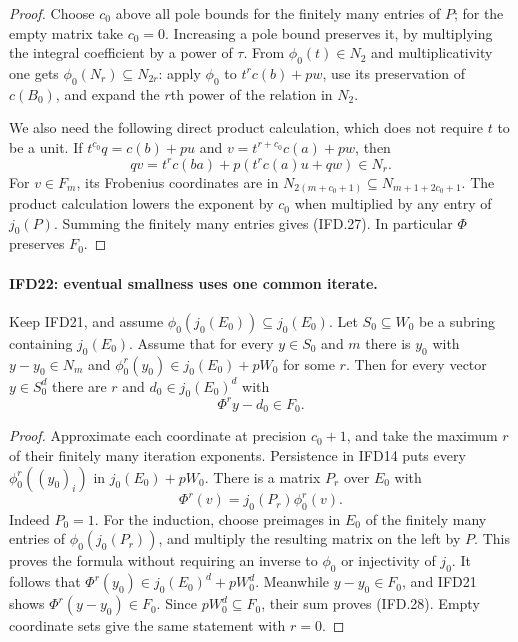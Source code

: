 \begin{proof}
Choose $c_0$ above all pole bounds for the finitely many entries
of $P$; for the empty matrix take $c_0=0$.
Increasing a pole bound preserves it, by multiplying the integral
coefficient by a power of $\tau$.
From $\phi_0(t)\in N_2$ and multiplicativity one gets
$\phi_0(N_r)\subseteq N_{2r}$: apply $\phi_0$ to
$t^rc(b)+pw$, use its preservation of $c(B_0)$, and expand the
$r$th power of the relation in $N_2$.

We also need the following direct product calculation, which does
not require $t$ to be a unit. If $t^{c_0}q=c(b)+pu$ and
$v=t^{r+c_0}c(a)+pw$, then
\[
                         qv=t^rc(ba)+p(t^rc(a)u+qw)\in N_r.
\]
For $v\in F_m$, its Frobenius coordinates are in
$N_{2(m+c_0+1)}\subseteq N_{m+1+2c_0+1}$.
The product calculation lowers the exponent by $c_0$ when
multiplied by any entry of $j_0(P)$. Summing the finitely many
entries gives (IFD.27). In particular $\Phi$ preserves $F_0$.
\end{proof}

\paragraph{IFD22: eventual smallness uses one common iterate.}
\label{claim:IFD22}
Keep IFD21, and assume $\phi_0(j_0(E_0))\subseteq j_0(E_0)$.
Let $S_0\subseteq W_0$ be a subring containing $j_0(E_0)$.
Assume that for every $y\in S_0$ and $m$ there is $y_0$ with
$y-y_0\in N_m$ and $\phi_0^r(y_0)\in j_0(E_0)+pW_0$ for
some $r$. Then for every vector $y\in S_0^d$ there are $r$
and $d_0\in j_0(E_0)^d$ with
\[
                              \Phi^r y-d_0\in F_0.         \tag{IFD.28}
\]

\begin{proof}
Approximate each coordinate at precision $c_0+1$, and take the
maximum $r$ of their finitely many iteration exponents.
Persistence in IFD14 puts every $\phi_0^r((y_0)_i)$ in
$j_0(E_0)+pW_0$. There is a matrix $P_r$ over $E_0$ with
\[
                              \Phi^r(v)=j_0(P_r)\phi_0^r(v).
\]
Indeed $P_0=1$. For the induction, choose preimages in $E_0$ of
the finitely many entries of $\phi_0(j_0(P_r))$, and multiply
the resulting matrix on the left by $P$. This proves the formula
without requiring an inverse to $\phi_0$ or injectivity of $j_0$.
It follows that $\Phi^r(y_0)\in j_0(E_0)^d+pW_0^d$.
Meanwhile $y-y_0\in F_0$, and IFD21 shows
$\Phi^r(y-y_0)\in F_0$. Since $pW_0^d\subseteq F_0$, their
sum proves (IFD.28). Empty coordinate sets give the same statement
with $r=0$.
\end{proof}

